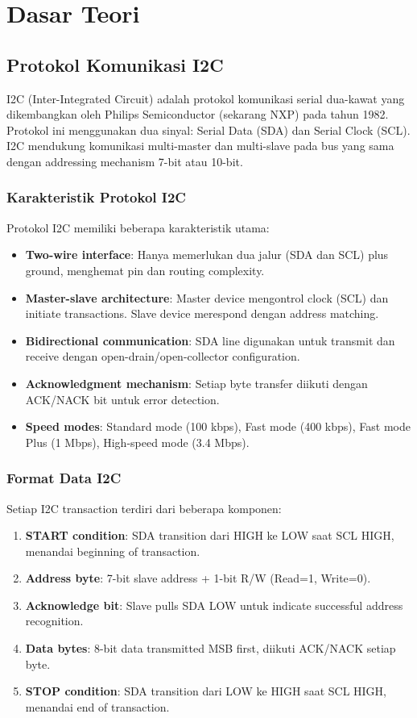 \section{Dasar Teori}

\subsection{Protokol Komunikasi I2C}

I2C (Inter-Integrated Circuit) adalah protokol komunikasi serial dua-kawat yang dikembangkan oleh Philips Semiconductor (sekarang NXP) pada tahun 1982. Protokol ini menggunakan dua sinyal: Serial Data (SDA) dan Serial Clock (SCL). I2C mendukung komunikasi multi-master dan multi-slave pada bus yang sama dengan addressing mechanism 7-bit atau 10-bit.

\subsubsection{Karakteristik Protokol I2C}

Protokol I2C memiliki beberapa karakteristik utama:
\begin{itemize}
	\item \textbf{Two-wire interface}: Hanya memerlukan dua jalur (SDA dan SCL) plus ground, menghemat pin dan routing complexity.
	\item \textbf{Master-slave architecture}: Master device mengontrol clock (SCL) dan initiate transactions. Slave device merespond dengan address matching.
	\item \textbf{Bidirectional communication}: SDA line digunakan untuk transmit dan receive dengan open-drain/open-collector configuration.
	\item \textbf{Acknowledgment mechanism}: Setiap byte transfer diikuti dengan ACK/NACK bit untuk error detection.
	\item \textbf{Speed modes}: Standard mode (100 kbps), Fast mode (400 kbps), Fast mode Plus (1 Mbps), High-speed mode (3.4 Mbps).
\end{itemize}

\subsubsection{Format Data I2C}

Setiap I2C transaction terdiri dari beberapa komponen:
\begin{enumerate}
	\item \textbf{START condition}: SDA transition dari HIGH ke LOW saat SCL HIGH, menandai beginning of transaction.
	\item \textbf{Address byte}: 7-bit slave address + 1-bit R/W (Read=1, Write=0).
	\item \textbf{Acknowledge bit}: Slave pulls SDA LOW untuk indicate successful address recognition.
	\item \textbf{Data bytes}: 8-bit data transmitted MSB first, diikuti ACK/NACK setiap byte.
	\item \textbf{STOP condition}: SDA transition dari LOW ke HIGH saat SCL HIGH, menandai end of transaction.
\end{enumerate}

